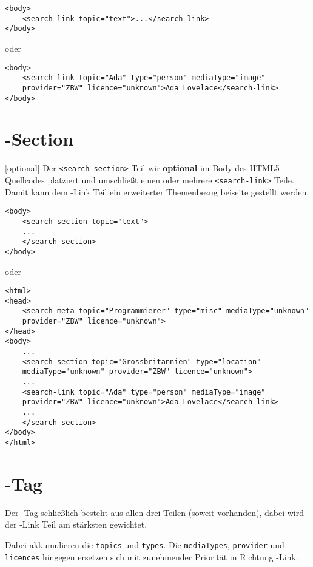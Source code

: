 \begin{lstlisting}
<body>
    <search-link topic="text">...</search-link>
</body>
\end{lstlisting}

oder

\begin{lstlisting}
<body>
    <search-link topic="Ada" type="person" mediaType="image"
    provider="ZBW" licence="unknown">Ada Lovelace</search-link>
</body>
\end{lstlisting}

\section{\SEARCH-Section}
[optional]
Der \Verb|<search-section>| Teil wir \textbf{optional} im Body des HTML5 Quellcodes platziert und umschließt einen oder mehrere \Verb|<search-link>| Teile. Damit kann dem \SEARCH-Link Teil ein erweiterter Themenbezug beiseite gestellt werden.

\begin{lstlisting}
<body>
    <search-section topic="text">
    ...
    </search-section>
</body>
\end{lstlisting}

oder

\begin{lstlisting}
<html>
<head>
    <search-meta topic="Programmierer" type="misc" mediaType="unknown"
    provider="ZBW" licence="unknown">
</head>
<body>
    ...
    <search-section topic="Grossbritannien" type="location"
    mediaType="unknown" provider="ZBW" licence="unknown">
    ...
    <search-link topic="Ada" type="person" mediaType="image"
    provider="ZBW" licence="unknown">Ada Lovelace</search-link>
    ...
    </search-section>
</body>
</html>
\end{lstlisting}

\section{\SEARCH-Tag}
Der \SEARCH-Tag schließlich besteht aus allen drei Teilen (soweit vorhanden), dabei wird der \SEARCH-Link Teil am stärksten gewichtet.

Dabei akkumulieren die \Verb|topics| und \Verb|types|.
Die \Verb|mediaTypes|, \Verb|provider| und \Verb|licences| hingegen ersetzen sich mit zunehmender Priorität in Richtung \SEARCH-Link.